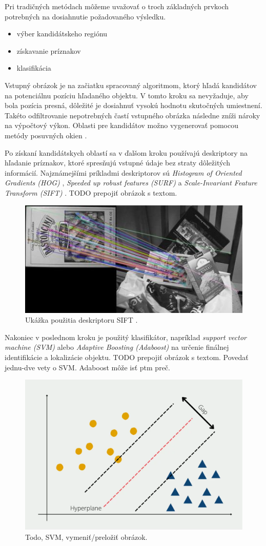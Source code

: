 Pri tradičných metódach môžeme uvažovať o troch základných prvkoch potrebných na dosiahnutie požadovaného výsledku.
\begin{itemize}
    \item výber kandidátskeho regiónu
    \item získavanie príznakov
    \item klasifikácia
\end{itemize}

Vstupný obrázok je na začiatku spracovaný algoritmom, ktorý hľadá kandidátov na potenciálnu pozíciu hľadaného objektu. V tomto kroku sa nevyžaduje, aby bola pozícia presná, dôležité je dosiahnuť vysokú hodnotu skutočných umiestnení. Takéto odfiltrovanie nepotrebných častí vstupného obrázka následne zníži nároky na výpočtový výkon. Oblasti pre kandidátov možno vygenerovať pomocou metódy  posuvných okien \cite{sel-search}.

Po získaní kandidátskych oblastí sa v ďalšom kroku používajú deskriptory na hľadanie príznakov, ktoré spresňujú vstupné údaje bez straty dôležitých informácií. Najznámejšími príkladmi deskriptorov sú \textit{Histogram of Oriented Gradients (HOG)} \cite{HOG}, \textit{Speeded up robust features (SURF)} \cite{SURF} a \textit{Scale-Invariant Feature Transform (SIFT)} \cite{SIFT}.
TODO prepojiť obrázok s textom.
\begin{figure}[H]
    \centering
    \includegraphics[width=.6\textwidth]{images/01/sift.jpeg}
    \caption{Ukážka použitia deskriptoru SIFT \cite{sift-img}.}
    \label{img:sift}
\end{figure}

Nakoniec v poslednom kroku je použitý klasifikátor, napríklad \textit{support vector machine (SVM)} \cite{SVM} alebo \textit{Adaptive Boosting (Adaboost)} \cite{Adaboost} na určenie finálnej identifikácie a lokalizácie objektu.
TODO prepojiť obrázok s textom. Povedať jednu-dve vety o SVM. Adaboost môže isť ptm preč.
\begin{figure}[H]
    \centering
    \includegraphics[width=.6\textwidth]{images/01/svm.png}
    \caption{Todo, SVM, vymeniť/preložiť obrázok.}
    \label{img:svm}
\end{figure}

